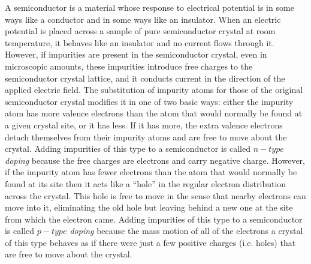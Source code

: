 \documentclass{revtex4}
\begin{document}
A semiconductor is a material whose response to electrical potential is
in some ways like a conductor and in some ways like an insulator.  When an
electric potential is placed across a sample of pure semiconductor crystal
at room temperature, it behaves like an insulator and no current flows
through it.  However, if impurities are present in the semiconductor crystal,
even in microscopic amounts, these impurities introduce free charges to the 
semiconductor crystal lattice, and it conducts current in the direction of
the applied electric field.  The substitution of impurity atoms for those
of the original semiconductor crystal modifies it in one of two basic ways:
either the impurity atom has more valence electrons than the atom that would
normally be found at a given crystal site, or it has less.  If it has more,
the extra valence electrons detach themselves from their impurity atoms and
are free to move about the crystal.  Adding impurities of this type to a
semiconductor is called {\em $n-type$ doping} because the free charges are
electrons and carry negative charge.  However, if the impurity atom has
fewer electrons than the atom that would normally be found at its site then it
acts like a ``hole'' in the regular electron distribution across the crystal.
This hole is free to move in the sense that nearby electrons can move into
it, eliminating the old hole but leaving behind a new one at the site from
which the electron came.  Adding impurities of this type to a semiconductor
is called {\em $p-type$ doping} because the mass motion of all of the
electrons a crystal of this type behaves as if there were just a few
positive charges (i.e. holes) that are free to move about the crystal.
\end{document}
